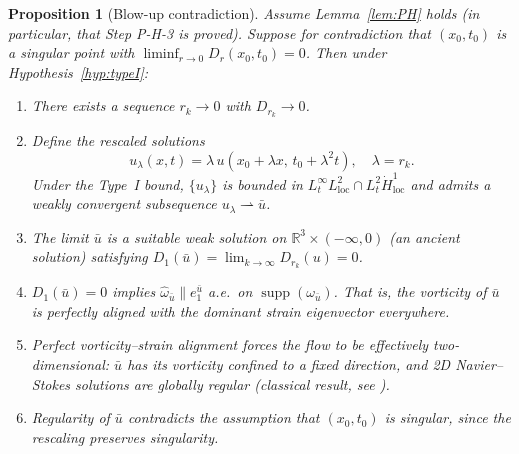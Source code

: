 \documentclass[11pt]{article}
\newtheorem{proposition}[theorem]{Proposition}
\theoremstyle{definition}
\theoremstyle{remark}
\DeclareMathOperator{\supp}{supp}
\newcommand{\R}{\mathbb{R}}
\begin{document}
\begin{proposition}[Blow-up contradiction]
\label{prop:blowup}
Assume Lemma~\ref{lem:PH} holds (in particular, that Step P-H-3 is proved).
Suppose for contradiction that $(x_0, t_0)$ is a singular point with
$\liminf_{r\to 0} D_r(x_0, t_0) = 0$.  Then under Hypothesis~\ref{hyp:typeI}:
\begin{enumerate}[nosep]
  \item There exists a sequence $r_k \to 0$ with $D_{r_k} \to 0$.
  \item Define the rescaled solutions
    \begin{equation}\label{eq:rescale}
      u_{\lambda}(x,t) = \lambda\, u(x_0 + \lambda x,\, t_0 + \lambda^2 t),
      \quad \lambda = r_k.
    \end{equation}
    Under the Type~I bound, $\{u_\lambda\}$ is bounded in
    $L^\infty_t L^2_{\mathrm{loc}} \cap L^2_t \dot{H}^1_{\mathrm{loc}}$ and
    admits a weakly convergent subsequence $u_\lambda \rightharpoonup \bar{u}$.
  \item The limit $\bar{u}$ is a suitable weak solution on $\R^3 \times (-\infty, 0)$
    (an ancient solution) satisfying $D_1(\bar{u}) = \lim_{k\to\infty} D_{r_k}(u) = 0$.
  \item $D_1(\bar{u}) = 0$ implies $\hat{\omega}_{\bar{u}} \| e_1^{\bar{u}}$ a.e.\ on
    $\supp(\omega_{\bar{u}})$.  That is, the vorticity of $\bar{u}$ is perfectly
    aligned with the dominant strain eigenvector everywhere.
  \item Perfect vorticity--strain alignment forces the flow to be effectively
    two-dimensional: $\bar{u}$ has its vorticity confined to a fixed direction,
    and 2D Navier--Stokes solutions are globally regular (classical result, see
    \cite{Leray}).
  \item Regularity of $\bar{u}$ contradicts the assumption that $(x_0, t_0)$ is
    singular, since the rescaling preserves singularity.
\end{enumerate}
\end{proposition}
\end{document}

